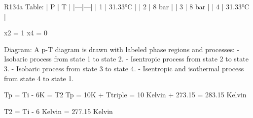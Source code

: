R134a  
Table:  
| P | T |  
|---|---|  
| 1 | 31.33°C |  
| 2 | 8 bar |  
| 3 | 8 bar |  
| 4 | 31.33°C |  

x2 = 1  
x4 = 0  

Diagram:  
A p-T diagram is drawn with labeled phase regions and processes:  
- Isobaric process from state 1 to state 2.  
- Isentropic process from state 2 to state 3.  
- Isobaric process from state 3 to state 4.  
- Isentropic and isothermal process from state 4 to state 1.  

Tp = Ti - 6K = T2  
Tp = 10K + Ttriple  
= 10 Kelvin + 273.15  
= 283.15 Kelvin  

T2 = Ti - 6 Kelvin = 277.15 Kelvin